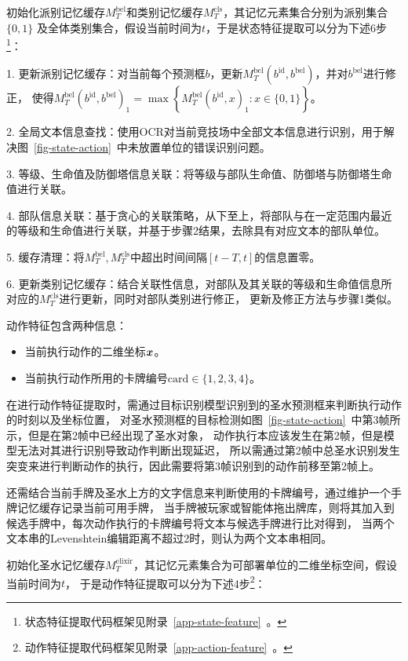 初始化派别记忆缓存$M_{T}^{\text{bel}}$和类别记忆缓存$M_{T}^{\text{cls}}$，其记忆元素集合分别为派别集合$\{0,1\}$
及全体类别集合，假设当前时间为$t$，于是状态特征提取可以分为下述6步\footnote{状态特征提取代码框架见附录~\ref{app-state-feature}~。}：

1. 更新派别记忆缓存：对当前每个预测框$b$，更新$M_{T}^{\text{bel}}(b^{\text{id}}, b^{\text{bel}})$，并对$b^{\text{bel}}$进行修正，
使得$M_T^{\text{bel}}(b^{\text{id}}, b^{\text{bel}})_1 = \max\left\{M_T^{\text{bel}}(b^{\text{id}},x)_1:x\in\{0,1\}\right\}$。

2. 全局文本信息查找：使用OCR对当前竞技场中全部文本信息进行识别，用于解决图~\ref{fig-state-action}~中未放置单位的错误识别问题。

3. 等级、生命值及防御塔信息关联：将等级与部队生命值、防御塔与防御塔生命值进行关联。

4. 部队信息关联：基于贪心的关联策略，从下至上，将部队与在一定范围内最近的等级和生命值进行关联，并基于步骤2结果，去除具有对应文本的部队单位。

5. 缓存清理：将$M_T^{\text{bel}},M_T^{\text{cls}}$中超出时间间隔$[t-T,t]$的信息置零。

6. 更新类别记忆缓存：结合关联性信息，对部队及其关联的等级和生命值信息所对应的$M_T^{\text{cls}}$进行更新，同时对部队类别进行修正，
更新及修正方法与步骤1类似。

\label{sub-sec-action}
动作特征包含两种信息：
\begin{itemize}
  \item 当前执行动作的二维坐标$\boldsymbol{x}$。
  \item 当前执行动作所用的卡牌编号$\text{card}\in\{1,2,3,4\}$。
\end{itemize}

在进行动作特征提取时，需通过目标识别模型识别到的圣水预测框来判断执行动作的时刻以及坐标位置，
对圣水预测框的目标检测如图~\ref{fig-state-action}~中第3帧所示，但是在第2帧中已经出现了圣水对象，
动作执行本应该发生在第2帧，但是模型无法对其进行识别导致动作判断出现延迟，
所以需通过第2帧中总圣水识别发生突变来进行判断动作的执行，因此需要将第3帧识别到的动作前移至第2帧上。

还需结合当前手牌及圣水上方的文字信息来判断使用的卡牌编号，通过维护一个手牌记忆缓存记录当前可用手牌，
当手牌被玩家或智能体拖出牌库，则将其加入到候选手牌中，每次动作执行的卡牌编号将文本与候选手牌进行比对得到，
当两个文本串的Levenshtein编辑距离不超过2时，则认为两个文本串相同。

初始化圣水记忆缓存$M_{T}^{\text{elixir}}$，其记忆元素集合为可部署单位的二维坐标空间，假设当前时间为$t$，
于是动作特征提取可以分为下述4步\footnote{动作特征提取代码框架见附录~\ref{app-action-feature}~。}：

